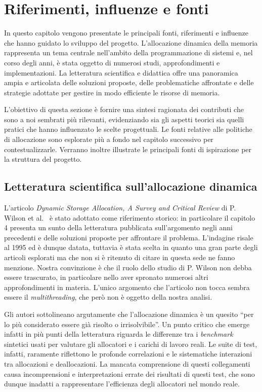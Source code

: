 \chapter{Riferimenti, influenze e fonti}

In questo capitolo vengono presentate le principali fonti, riferimenti e influenze che hanno guidato lo sviluppo del progetto. L’allocazione dinamica della memoria rappresenta un tema centrale nell’ambito della programmazione di sistemi e, nel corso degli anni, è stata oggetto di numerosi studi, approfondimenti e implementazioni. La letteratura scientifica e didattica offre una panoramica ampia e articolata delle soluzioni proposte, delle problematiche affrontate e delle strategie adottate per gestire in modo efficiente le risorse di memoria.

L’obiettivo di questa sezione è fornire una sintesi ragionata dei contributi che sono a noi sembrati più rilevanti, evidenziando sia gli aspetti teorici sia quelli pratici che hanno influenzato le scelte progettuali. Le fonti relative alle politiche di allocazione sono esplorate più a fondo nel capitolo successivo per contestualizzarle. Verranno inoltre illustrate le principali fonti di ispirazione per la struttura del progetto.

\section{Letteratura scientifica sull’allocazione dinamica}

L’articolo \textit{Dynamic Storage Allocation, A Survey and Critical Review} di P. Wilson et al.~\cite{wilson1995} è stato adottato come riferimento storico: in particolare il capitolo 4 presenta un sunto della letteratura pubblicata sull’argomento negli anni precedenti e delle soluzioni proposte per affrontare il problema. L'indagine risale al 1995 ed è dunque datata, tuttavia è stata scelta in quanto una gran parte degli articoli esplorati ma che non si è ritenuto di citare in questa sede ne fanno menzione. Nostra convinzione è che il ruolo dello studio di P. Wilson non debba essere trascurato, in particolare nello aver spronato numerosi altri approfondimenti in materia. L'unico argomento che l'articolo non tocca sembra essere il \textit{multithreading}, che però non è oggetto della nostra analisi. 

Gli autori sottolineano argutamente che l'allocazione dinamica è un quesito ``per lo più considerato essere già risolto o irrisolvibile''. Un punto critico che emerge infatti in più punti della letteratura riguarda le differenze tra i \textit{benchmark} sintetici usati per valutare gli allocatori e i carichi di lavoro reali. Le suite di test, infatti, raramente riflettono le profonde correlazioni e le sistematiche interazioni tra allocazioni e deallocazioni. La mancata comprensione di questi collegamenti causa incomprensioni e interpretazioni errate dei risultati di questi test, che sono dunque inadatti a rappresentare l’efficienza degli allocatori nel mondo reale. 

